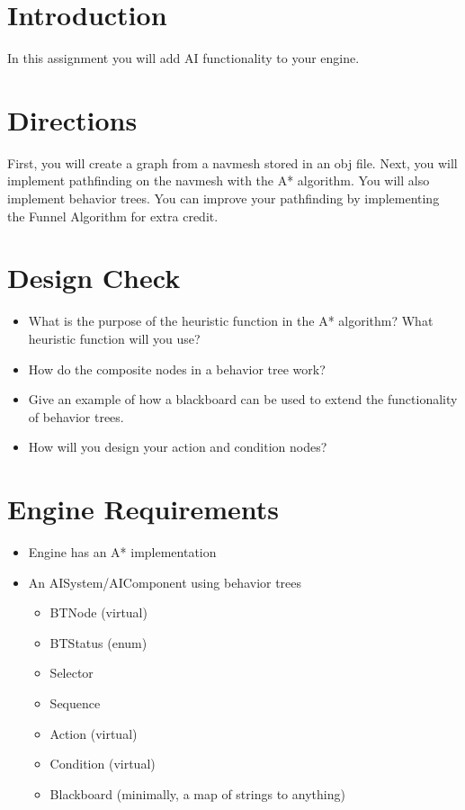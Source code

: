 \documentclass{../cs195u}
\begin{document}
 \section*{Introduction}

In this assignment you will add AI functionality to your engine.

 \section*{Directions}
  
First, you will create a graph from a navmesh stored in an obj file. Next, you will implement pathfinding on the navmesh with the A* algorithm. You will also implement behavior trees. You can improve your pathfinding by implementing the Funnel Algorithm for extra credit.

  \section*{Design Check}
  \begin{itemize}
   \item What is the purpose of the heuristic function in the A* algorithm? What heuristic function will you use?
   \item How do the composite nodes in a behavior tree work?
   \item Give an example of how a blackboard can be used to extend the functionality of behavior trees.
   \item How will you design your action and condition nodes?
  \end{itemize}

  \section*{Engine Requirements}
  \begin{itemize}
    \item Engine has an A* implementation
    \item An AISystem/AIComponent using behavior trees
    \begin{itemize}
    	\item BTNode (virtual)
	\item BTStatus (enum)
	\item Selector
	\item Sequence
	\item Action (virtual)
	\item Condition (virtual)
	\item Blackboard (minimally, a map of strings to anything)
    \end{itemize}
 \end{itemize}
 
\end{document}
